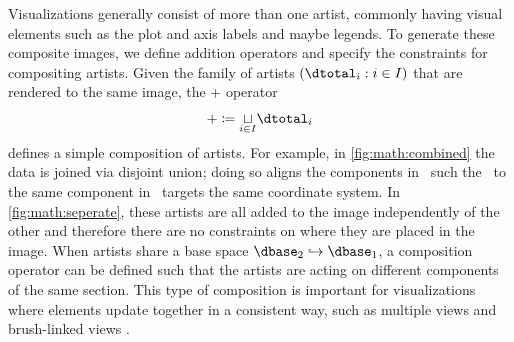 \documentclass[../main.tex]{subfiles}
\begin{document}
Visualizations generally consist of more than one artist, commonly having visual elements such as the plot and axis labels and maybe legends. To generate these composite images, we define addition operators and specify the constraints for compositing artists. Given the family of artists $(\dtotal_i: i\in I)$ that are rendered to the same image, the + operator 
\begin{equation}
+ \coloneqq \underset{i\in I}{\sqcup} \dtotal_{i}
\end{equation}
defines a simple composition of artists. For example, in \autoref{fig:math:combined} the data is joined via disjoint union; doing so aligns the components in \dfiber\ such the \vchannel\ to the same component in \vfiber\ targets the same coordinate system. In \autoref{fig:math:seperate}, these artists are all added to the image independently of the other and therefore there are no constraints on where they are placed in the image. When artists share a base space $\dbase_2 \hookrightarrow \dbase_1$, a composition operator can be defined such that the artists are acting on different components of the same section. This type of composition is important for visualizations where elements update together in a consistent way, such as multiple views \cite{alboRadarComparativeEvaluation2016a, hullmanKeeping2018} and brush-linked views \cite{beckerBrushingScatterplots1987,bujaInteractiveData1991}.
\end{document}
